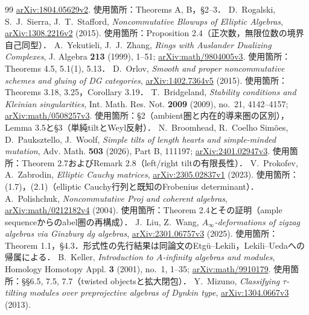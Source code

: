 \documentclass[11pt,a4paper]{ltjsarticle}
\theoremstyle{definition}
\begin{document}
\begin{thebibliography}{99}
\href{https://arxiv.org/abs/1804.05629}{arXiv:1804.05629v2}.
使用箇所：Theorems A, B，\S2--3．
D.~Rogalski, S.~J.~Sierra, J.~T.~Stafford,
\emph{Noncommutative Blowups of Elliptic Algebras},
\href{https://arxiv.org/abs/1308.2216}{arXiv:1308.2216v2} (2015).
使用箇所：Proposition 2.4（正次数，無限位数の境界自己同型）．
A.~Yekutieli, J.~J.~Zhang, \emph{Rings with Auslander Dualizing Complexes},
J. Algebra \textbf{213} (1999), 1--51;
\href{https://arxiv.org/abs/math/9804005}{arXiv:math/9804005v3}.
使用箇所：Theorems 4.5, 5.1(1), 5.13．
D.~Orlov, \emph{Smooth and proper noncommutative schemes and gluing of DG categories},
\href{https://arxiv.org/abs/1402.7364}{arXiv:1402.7364v5} (2015).
使用箇所：Theorems 3.18, 3.25，Corollary 3.19．
T.~Bridgeland, \emph{Stability conditions and Kleinian singularities},
Int. Math. Res. Not. \textbf{2009} (2009), no.~21, 4142--4157;
\href{https://arxiv.org/abs/math/0508257}{arXiv:math/0508257v3}.
使用箇所：\S2（ambient圏と内在的導来圏の区別），Lemma 3.5と\S3（単純tiltとWeyl反射）．
N.~Broomhead, R.~Coelho Sim\~oes, D.~Pauksztello, J.~Woolf,
\emph{Simple tilts of length hearts and simple-minded mutation},
Adv. Math. \textbf{503} (2026), Part B, 111197;
\href{https://arxiv.org/abs/2401.02947}{arXiv:2401.02947v3}.
使用箇所：Theorem 2.7およびRemark 2.8（left/right tiltの有限長性）．
V.~Prokofev, A.~Zabrodin, \emph{Elliptic Cauchy matrices},
\href{https://arxiv.org/abs/2305.02837}{arXiv:2305.02837v1} (2023).
使用箇所：(1.7)，(2.1)（elliptic Cauchy行列と既知のFrobenius determinant）．
A.~Polishchuk, \emph{Noncommutative Proj and coherent algebras},
\href{https://arxiv.org/abs/math/0212182}{arXiv:math/0212182v4} (2004).
使用箇所：Theorem 2.4とその証明（ample sequenceからのabel圏の再構成）．
J.~Liu, Z.~Wang, \emph{$A_\infty$-deformations of zigzag algebras via Ginzburg dg algebras},
\href{https://arxiv.org/abs/2301.06757v3}{arXiv:2301.06757v3} (2025).
使用箇所：Theorem 1.1，\S4.3．形式性の先行結果は同論文のEtg\"u--Lekili，Lekili--Uedaへの帰属による．
B.~Keller, \emph{Introduction to $A$-infinity algebras and modules},
Homology Homotopy Appl. \textbf{3} (2001), no.~1, 1--35;
\href{https://arxiv.org/abs/math/9910179}{arXiv:math/9910179}.
使用箇所：\S\S6.5, 7.5, 7.7（twisted objectsと拡大閉包）．
Y.~Mizuno, \emph{Classifying $\tau$-tilting modules over preprojective algebras of Dynkin type},
\href{https://arxiv.org/abs/1304.0667v3}{arXiv:1304.0667v3} (2013).

\end{thebibliography}
\end{document}
